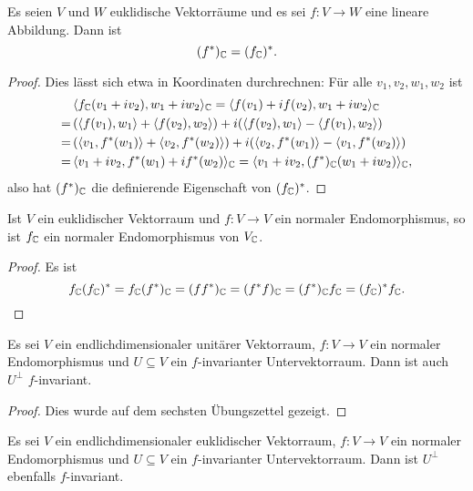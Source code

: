\documentclass[a4paper,10pt]{article}
\begin{document}
\begin{proposition}
  Es seien $V$ und $W$ euklidische Vektorräume und es sei $f \colon V \to W$ eine lineare Abbildung.
  Dann ist
  \[
    (f^*)_{\mathbb{C}} = (f_{\mathbb{C}})^*.
  \]
\end{proposition}


\begin{proof}
  Dies lässt sich etwa in Koordinaten durchrechnen:
  Für alle $v_1, v_2, w_1, w_2$ ist
  \begin{align*}
     &\,  \langle  f_{\mathbb{C}}( v_1 + i v_2 ), w_1 + i w_2  \rangle_{\mathbb{C}}
    =     \langle  f(v_1) + i f(v_2), w_1 + i w_2 \rangle_{\mathbb{C}} \\
    =&\,  (\langle f(v_1), w_1 \rangle + \langle f(v_2), w_2 \rangle) + i(\langle f(v_2), w_1 \rangle - \langle f(v_1), w_2 \rangle) \\
    =&\,  (\langle v_1, f^*(w_1) \rangle + \langle v_2, f^*(w_2) \rangle) + i(\langle v_2, f^*(w_1) \rangle - \langle v_1, f^*(w_2) \rangle) \\
    =&\,  \langle  v_1 + i v_2, f^*(w_1) + i f^*(w_2)  \rangle_{\mathbb{C}}
    =     \langle  v_1 + i v_2, (f^*)_{\mathbb{C}}( w_1 + i w_2 )  \rangle_{\mathbb{C}},
  \end{align*}
  also hat $(f^*)_{\mathbb{C}}$ die definierende Eigenschaft von $(f_{\mathbb{C}})^*$.
\end{proof}


\begin{corollary}\label{cor: complexification preserves normal}
  Ist $V$ ein euklidischer Vektorraum und $f \colon V \to V$ ein normaler Endomorphismus, so ist $f_{\mathbb{C}}$ ein normaler Endomorphismus von $V_{\mathbb{C}}$.
\end{corollary}


\begin{proof}
  Es ist
  \[
      f_{\mathbb{C}} (f_{\mathbb{C}})^*
    = f_{\mathbb{C}} (f^*)_{\mathbb{C}}
    = (f f^*)_{\mathbb{C}}
    = (f^* f)_{\mathbb{C}}
    = (f^*)_{\mathbb{C}} f_{\mathbb{C}}
    = (f_{\mathbb{C}})^* f_{\mathbb{C}}.
    \qedhere
  \]
\end{proof}


\begin{theorem}\label{thrm: invariance for unitary}
  Es sei $V$ ein endlichdimensionaler unitärer Vektorraum, $f \colon V \to V$ ein normaler Endomorphismus und $U \subseteq V$ ein $f$-invarianter Untervektorraum.
  Dann ist auch $U^\perp$ $f$-invariant.
\end{theorem}


\begin{proof}
  Dies wurde auf dem sechsten Übungszettel gezeigt.
\end{proof}


\begin{corollary}
  Es sei $V$ ein endlichdimensionaler euklidischer Vektorraum, $f \colon V \to V$ ein normaler Endomorphismus und $U \subseteq V$ ein $f$-invarianter Untervektorraum.
  Dann ist $U^\perp$ ebenfalls $f$-invariant.
\end{corollary}
\end{document}
